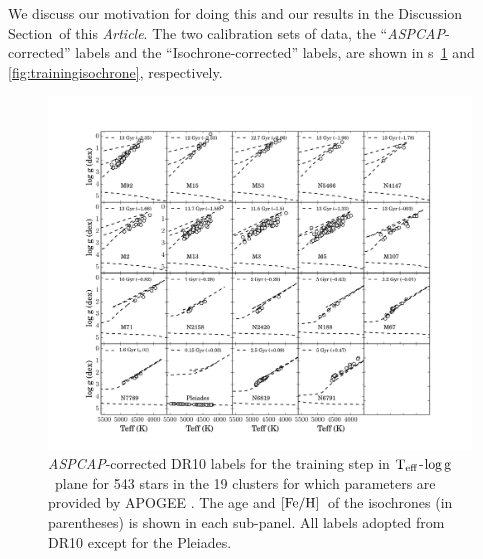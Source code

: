 \documentclass[12pt, preprint]{aastex}
\newcommand{\documentname}{\textsl{Article}}
\newcommand{\sectionname}{Section}
\newcommand{\figurenames}{\figurename s}
\newcommand{\teff}{\mbox{$\rm T_{eff}$}}
\newcommand{\feh}{\mbox{$\rm [Fe/H]$}}
\newcommand{\logg}{\mbox{$\rm \log g$}}
\newcommand{\aspcap}{\textsl{ASPCAP}}
\begin{document}
We discuss our motivation for doing this and our results in the Discussion \sectionname\ of this \documentname.
The two calibration sets of data, the ``\aspcap-corrected'' labels and the ``Isochrone-corrected'' labels, are shown in \figurenames~\ref{fig:trainingaspcap} and \ref{fig:trainingisochrone}, respectively. 

\begin{figure}[h!]
\centering
    \includegraphics[scale=0.33]{./plots/training_aspcap.pdf}
\caption{\aspcap-corrected DR10 labels  for the training step in \teff-\logg\ plane for 543 stars in the 19 clusters for which parameters are provided by APOGEE \citep{Meszaros2013}. The age and \feh\ of the isochrones (in parentheses) is shown in each sub-panel. All labels adopted from DR10 except for the Pleiades. }
\label{fig:trainingaspcap}
\end{figure}
\end{document}
